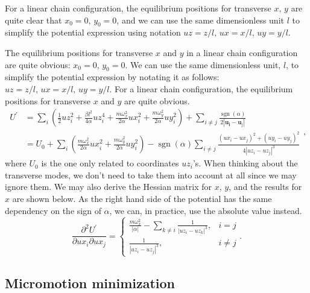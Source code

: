 For a linear chain configuration, the equilibrium positions for transverse \(x,\, y\) are quite clear that \(x_0=0,\,y_0=0\), and we can use the same dimensionless unit \(l\) to simplify the potential expression using notation \(uz=z/l,\, ux=x/l,\, uy=y/l\).

The equilibrium positions for transverse \(x\) and \(y\) in a linear chain configuration are quite obvious: \(x_0=0,\,y_0=0\). We can use the same dimensionless unit, \(l\), to simplify the potential expression by notating it as follows: \(uz=z/l,\, ux=x/l,\, uy=y/l\). For a linear chain configuration, the equilibrium positions for transverse \(x\) and \(y\) are quite obvious.
\begin{equation}
    \begin{aligned}
        U^{\prime} & =\sum_i\left(\frac{1}{2} u z_i^2+\frac{\beta l^2}{4 \alpha} u z_i^4+\frac{m \omega_x^2}{2 \alpha} u x_i^2+\frac{m \omega_y^2}{2 \alpha} u y_i^2\right)+\sum_{i \neq j} \frac{\operatorname{sgn}(\alpha)}{2\left|\mathbf{u}_{\mathbf{i}}-\mathbf{u}_{\mathrm{j}}\right|} \\
                   & =U_0+\sum_i\left(\frac{m \omega_x^2}{2 \alpha} u x_i^2+\frac{m \omega_y^2}{2 \alpha} u y_i^2\right)-\operatorname{sgn}(\alpha) \sum_{i \neq j} \frac{\left(u x_i-u x_j\right)^2+\left(u y_i-u y_j\right)^2}{4\left|u z_i-u z_j\right|^3}
    \end{aligned}
    ,
\end{equation}
where \(U_0\) is the one only related to coordinates \(uz_i\)'s. When thinking about the transverse modes, we don't need to take them into account at all since we may ignore them. We may also derive the Hessian matrix for \(x,\, y\), and the results for \(x\) are shown below. As the right hand side of the potential has the same dependency on the sign of \(\alpha\), we can, in practice, use the absolute value instead.
\begin{equation}
    \frac{\partial^2 U^{\prime}}{\partial u x_i \partial u x_j}= \begin{cases}\frac{m \omega_x^2}{|\alpha|}-\sum_{k \neq i} \frac{1}{\left|u z_i-u z_k\right|^3}, & i=j \\ \frac{1}{\left|u z_i-u z_j\right|^3}, & i \neq j\end{cases}.
\end{equation}

\subsection{Micromotion minimization}

